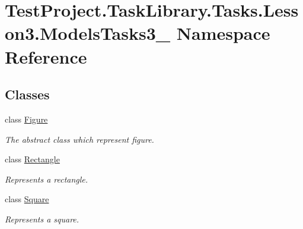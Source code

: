 \hypertarget{namespace_test_project_1_1_task_library_1_1_tasks_1_1_lesson3_1_1_models_tasks3__4}{}\section{Test\+Project.\+Task\+Library.\+Tasks.\+Lesson3.\+Models\+Tasks3\+\_ Namespace Reference}
\label{namespace_test_project_1_1_task_library_1_1_tasks_1_1_lesson3_1_1_models_tasks3__4}
\subsection*{Classes}
\begin{DoxyCompactItemize}
\item 
class \mbox{\hyperlink{class_test_project_1_1_task_library_1_1_tasks_1_1_lesson3_1_1_models_tasks3__4_1_1_figure}{Figure}}
\begin{DoxyCompactList}\small\item\em The abstract class which represent figure. \end{DoxyCompactList}\item 
class \mbox{\hyperlink{class_test_project_1_1_task_library_1_1_tasks_1_1_lesson3_1_1_models_tasks3__4_1_1_rectangle}{Rectangle}}
\begin{DoxyCompactList}\small\item\em Represents a rectangle. \end{DoxyCompactList}\item 
class \mbox{\hyperlink{class_test_project_1_1_task_library_1_1_tasks_1_1_lesson3_1_1_models_tasks3__4_1_1_square}{Square}}
\begin{DoxyCompactList}\small\item\em Represents a square. \end{DoxyCompactList}\end{DoxyCompactItemize}
